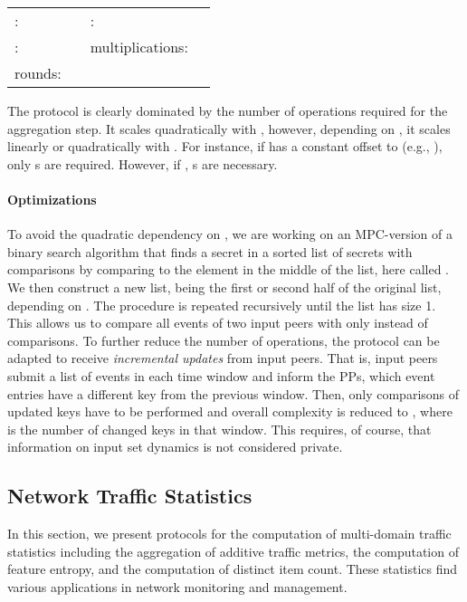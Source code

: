 \documentclass[letterpaper,11pt,onecolumn,titlepage]{article}
\begin{document}
\vspace{2mm}
\begin{tabular}{llll}
	:						&   & :				  &			\\
	:				&			&	multiplications:	  &			\\
rounds:						  &			
\end{tabular}
\vspace{2mm}



The protocol is clearly dominated by the number of  operations required for the aggregation step. It scales quadratically with , however, depending on , it scales linearly or quadratically with . 
For instance, if  has a constant offset to  (e.g., ), only	 s are required. However, if ,  s
are necessary.


\paragraph{Optimizations} To avoid the quadratic dependency on , we are working on an MPC-version of
a binary search algorithm that finds a secret  in a sorted list of secrets  with  comparisons by 
comparing  to the element in the middle of the list, here called . We then construct a new list, being
the first or second half of the original list, depending on . The procedure is repeated recursively until the list has size 1.
This allows us to compare all events of two input peers with only  instead of  comparisons.
To further reduce the number of  operations, the protocol can be adapted
to receive \emph{incremental updates} from input peers. That is, input peers submit a list of events in each time window and
inform the PPs, which event entries have a different key from the previous window. Then, only comparisons of updated keys have to be performed and overall complexity is reduced to , where  is the number of changed keys in that window. This requires, of course, that information on input set dynamics is not considered private.

\subsection{Network Traffic Statistics}
\label{sec:statistics}

In this section, we present protocols for the computation of multi-domain traffic statistics including
the aggregation of additive traffic metrics, the computation of feature entropy, and the computation of
distinct item count. These statistics find various applications in network monitoring and management.
\end{document}
